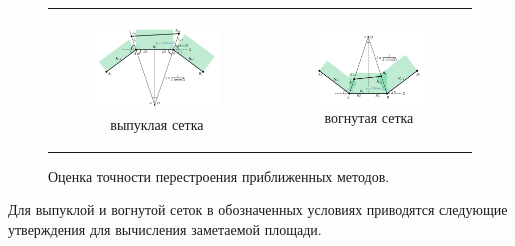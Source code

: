 \documentclass[a4paper,14pt]{extarticle}                     %
\theoremstyle{plain}                                         %
\begin{document}
\begin{figure}[ht]
\centering
\begin{tabular}{cc}
\begin{subfigure}{0.4\textwidth}\centering\includegraphics[width=1.0\columnwidth]{pics/text_1_remesh_2d/theoretical.pdf}\caption{выпуклая сетка}\end{subfigure} &
\begin{subfigure}{0.4\textwidth}\centering\includegraphics[width=1.0\columnwidth]{pics/text_1_remesh_2d/theoretical_concave.pdf}\caption{вогнутая сетка}\end{subfigure}
\end{tabular}
\singlespacing
\caption{Оценка точности перестроения приближенных методов.}
\label{fig:remesh_2d_accuracy}
\end{figure}

Для выпуклой и вогнутой сеток в обозначенных условиях приводятся следующие утверждения для вычисления заметаемой площади.
\end{document}
